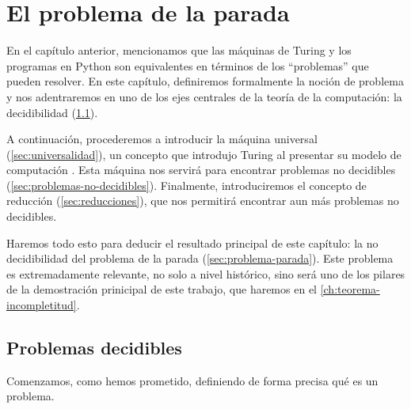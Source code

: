 

\chapter{El problema de la parada}\label{ch:problema-parada}

En el capítulo anterior, mencionamos que las máquinas de Turing y los programas en Python son equivalentes en términos de los ``problemas'' que pueden resolver. En este capítulo, definiremos formalmente la noción de problema y nos adentraremos en uno de los ejes centrales de la teoría de la computación: la decidibilidad (\cref{sec:problemas-decidibles}).

A continuación, procederemos a introducir la máquina universal (\cref{sec:universalidad}), un concepto que introdujo Turing al presentar su modelo de computación \cite{Turing1937}. Esta máquina nos servirá para encontrar problemas no decidibles (\cref{sec:problemas-no-decidibles}). Finalmente, introduciremos el concepto de reducción (\cref{sec:reducciones}), que nos permitirá encontrar aun más problemas no decidibles.

Haremos todo esto para deducir el resultado principal de este capítulo: la no decidibilidad del problema de la parada (\cref{sec:problema-parada}). Este problema es extremadamente relevante, no solo a nivel histórico, sino será uno de los pilares de la demostración prinicipal de este trabajo, que haremos en el \cref{ch:teorema-incompletitud}.

\section{Problemas decidibles}\label{sec:problemas-decidibles}

Comenzamos, como hemos prometido, definiendo de forma precisa qué es un problema. \cite{MacCormick2018,Sipser2012}

